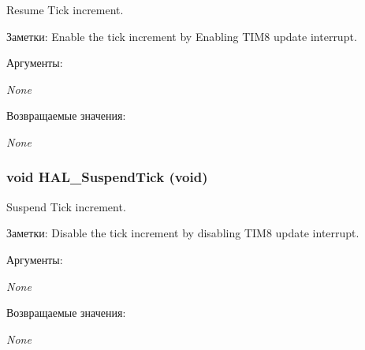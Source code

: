 Resume Tick increment. 

\begin{Desc}
\item[Заметки:]Enable the tick increment by Enabling TIM8 update interrupt. \end{Desc}
\begin{Desc}
\item[Аргументы:]
\begin{description}
\item[{\em None}]\end{description}
\end{Desc}
\begin{Desc}
\item[Возвращаемые значения:]
\begin{description}
\item[{\em None}]\end{description}
\end{Desc}
\hypertarget{group___h_a_l___time_base_gaf651af2afe688a991c657f64f8fa5f9}{
\subsubsection[{HAL\_\-SuspendTick}]{\setlength{\rightskip}{0pt plus 5cm}void HAL\_\-SuspendTick (void)}}
\label{group___h_a_l___time_base_gaf651af2afe688a991c657f64f8fa5f9}


Suspend Tick increment. 

\begin{Desc}
\item[Заметки:]Disable the tick increment by disabling TIM8 update interrupt. \end{Desc}
\begin{Desc}
\item[Аргументы:]
\begin{description}
\item[{\em None}]\end{description}
\end{Desc}
\begin{Desc}
\item[Возвращаемые значения:]
\begin{description}
\item[{\em None}]\end{description}
\end{Desc}
